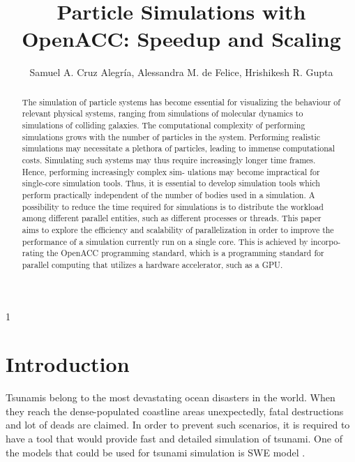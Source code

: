 \documentclass{usiinftr}
\begin{document}
\title{\bf Particle Simulations with OpenACC: Speedup and Scaling}

\author{Samuel A. Cruz Alegría, Alessandra M. de Felice, Hrishikesh R. Gupta}{1}


%
%

%
%

\maketitle

\begin{abstract}
The simulation of particle systems has become essential for visualizing the behaviour of relevant physical systems, ranging from simulations of molecular dynamics to simulations of colliding galaxies. The computational complexity of performing simulations grows with the number of particles in the system. Performing realistic simulations may necessitate a plethora of particles, leading to immense computational costs. Simulating such systems may thus require increasingly longer time frames. Hence, performing increasingly complex sim- ulations may become impractical for single-core simulation tools. Thus, it is essential to develop simulation tools which perform practically independent of the number of bodies used in a simulation. A possibility to reduce the time required for simulations is to distribute the workload among different parallel entities, such as different processes or threads. This paper aims to explore the efficiency and scalability of parallelization in order to improve the performance of a simulation currently run on a single core. This is achieved by incorpo- rating the OpenACC programming standard, which is a programming standard for parallel computing that utilizes a hardware accelerator, such as a GPU.
\end{abstract}

\section{Introduction}
Tsunamis belong to the most devastating ocean disasters in the world. When they reach the dense-populated  
coastline areas unexpectedly, fatal destructions and lot of deads are claimed. In order to prevent
such scenarios, it is required to have a tool that would provide fast and detailed simulation of tsunami.
One of the models that could be used for tsunami simulation is SWE model \cite{swe, BreuerB12}. 
\end{document}
